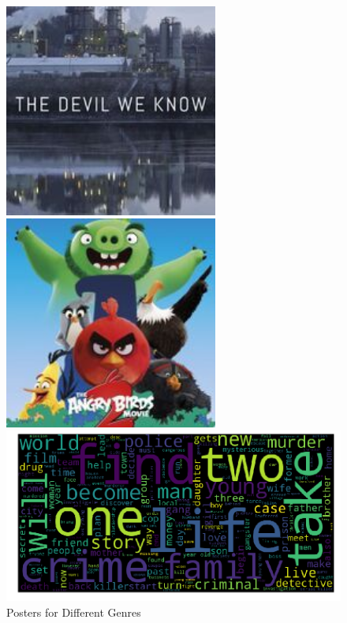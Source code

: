 \documentclass[12pt]{article} %
\begin{document}
\begin{figure}[H]
\centering
\begin{minipage}{0.5\textwidth}
  \centering
  \begin{minipage}{0.5\textwidth}
    \centering
    \includegraphics[width=0.98\linewidth,height=7cm]{poster.png}
  \end{minipage}%
  \begin{minipage}{0.5\textwidth}
    \centering
    \includegraphics[width=0.98\linewidth,height=7cm]{poster1.png}
  \end{minipage}%
  \caption{Posters for Different Genres}
  \label{fig:poster-dif}
\end{minipage}%
\begin{minipage}{0.5\textwidth}
  \centering
  \begin{minipage}{\textwidth}
    \centering
    \includegraphics[width=\linewidth]{wordcloud.png}

\end{minipage}
\end{minipage}
\end{figure}
\end{document}
